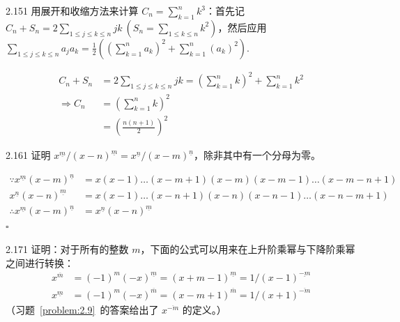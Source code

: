 \begin{problem}{2.15}{1}
  用展开和收缩方法来计算 \( C_n = \sum_{k=1}^n k^3 \)：首先记 \( C_n + S_n = 2 \sum_{1 \leq j \leq k \leq n} jk \ (S_n = \sum_{1 \leq k \leq n} k^2) \)，然后应用 \( \sum_{1 \leq j \leq k \leq n} a_j a_k = \frac{1}{2} ((\sum_{k=1}^n a_k)^2 + \sum_{k=1}^n (a_k)^2) \).
\end{problem}

\begin{align*}
  C_n + S_n &= 2 \sum_{1 \leq j \leq k \leq n} jk = (\sum_{k=1}^n k)^2 + \sum_{k=1}^n k^2 \\
  \Rightarrow C_n &= (\sum_{k=1}^n k)^2 \\
  &= (\frac{n(n+1)}{2})^2
\end{align*}

\begin{problem}{2.16}{1}
  证明 \( x^{\underline{m}} / (x - n)^{\underline{m}} = x^{\underline{n}} / (x - m)^{\underline{n}} \)，除非其中有一个分母为零。
\end{problem}

\begin{align*}
  \because x^{\underline{m}} (x - m)^{\underline{n}} &= x(x-1) \dots (x - m + 1) (x - m) (x - m - 1) \dots (x - m - n + 1) \\
  x^{\underline{n}} (x - n)^{\underline{m}} &= x(x - 1) \dots (x - n + 1) (x - n) (x - n - 1) \dots (x - n - m + 1) \\
  \therefore x^{\underline{m}} (x - m)^{\underline{n}} &= x^{\underline{n}} (x - n)^{\underline{m}}
\end{align*}
\hfill \( \square \)

\begin{problem}{2.17}{1}
  证明：对于所有的整数 \( m \)，下面的公式可以用来在上升阶乘幂与下降阶乘幂之间进行转换：
  \begin{align*}
    x^{\overline{m}} &= (-1)^m (-x)^{\underline{m}} = (x + m - 1)^{\underline{m}} = 1 / (x - 1)^{\underline{-m}} \\
    x^{\underline{m}} &= (-1)^m (-x)^{\overline{m}} = (x - m + 1)^{\overline{m}} = 1 / (x + 1)^{\overline{-m}}
  \end{align*}
  （习题~\ref{problem:2.9}~的答案给出了 \( x^{\overline{-m}} \) 的定义。）
\end{problem}


